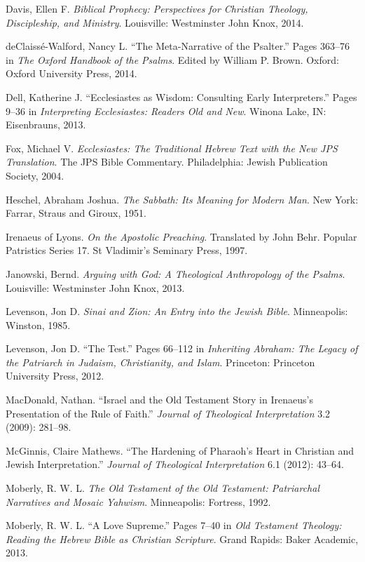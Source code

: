 \documentclass[titlepage]{article}
\begin{document}
\begin{thebibliography}{99}
 Davis, Ellen F. \emph{Biblical Prophecy: Perspectives for Christian Theology, Discipleship, and Ministry}. Louisville: Westminster John Knox, 2014.

 deClaissé-Walford, Nancy L. “The Meta-Narrative of the Psalter.” Pages 363–76 in \emph{The Oxford Handbook of the Psalms}. Edited by William P. Brown. Oxford: Oxford University Press, 2014.

 Dell, Katherine J. “Ecclesiastes as Wisdom: Consulting Early Interpreters.” Pages 9–36 in \emph{Interpreting Ecclesiastes: Readers Old and New}. Winona Lake, IN: Eisenbrauns, 2013.

 Fox, Michael V. \emph{Ecclesiastes: The Traditional Hebrew Text with the New JPS Translation}. The JPS Bible Commentary. Philadelphia: Jewish Publication Society, 2004.

 Heschel, Abraham Joshua. \emph{The Sabbath: Its Meaning for Modern Man}. New York: Farrar, Straus and Giroux, 1951.

 Irenaeus of Lyons. \emph{On the Apostolic Preaching}. Translated by John Behr. Popular Patristics Series 17. St Vladimir’s Seminary Press, 1997.

 Janowski, Bernd. \emph{Arguing with God: A Theological Anthropology of the Psalms}. Louisville: Westminster John Knox, 2013.

 Levenson, Jon D. \emph{Sinai and Zion: An Entry into the Jewish Bible}. Minneapolis: Winston, 1985.

 Levenson, Jon D. “The Test.” Pages 66–112 in \emph{Inheriting Abraham: The Legacy of the Patriarch in Judaism, Christianity, and Islam}. Princeton: Princeton University Press, 2012.

 MacDonald, Nathan. “Israel and the Old Testament Story in Irenaeus’s Presentation of the Rule of Faith.” \emph{Journal of Theological Interpretation} 3.2 (2009): 281–98.

 McGinnis, Claire Mathews. “The Hardening of Pharaoh’s Heart in Christian and Jewish Interpretation.” \emph{Journal of Theological Interpretation} 6.1 (2012): 43–64.

 Moberly, R. W. L. \emph{The Old Testament of the Old Testament: Patriarchal Narratives and Mosaic Yahwism}. Minneapolis: Fortress, 1992.

 Moberly, R. W. L. “A Love Supreme.” Pages 7–40 in \emph{Old Testament Theology: Reading the Hebrew Bible as Christian Scripture}. Grand Rapids: Baker Academic, 2013.


\end{thebibliography}
\end{document}
